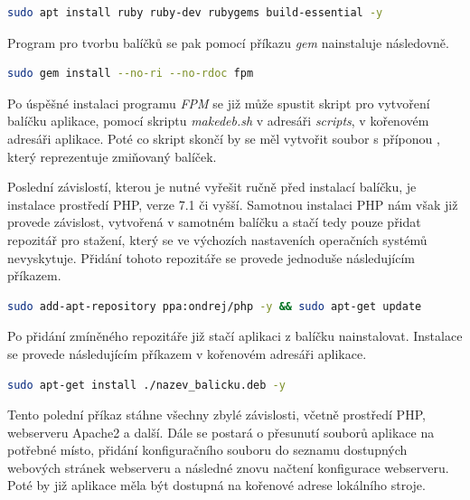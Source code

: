 \documentclass[thesis=M,czech]{FITthesis}[2012/06/26]
\begin{document}
\begin{lstlisting}[language=bash,identifierstyle=\color{black}]
sudo apt install ruby ruby-dev rubygems build-essential -y
\end{lstlisting}

Program pro tvorbu balíčků se pak pomocí příkazu \textit{gem} nainstaluje následovně.\\

\begin{lstlisting}[language=bash,identifierstyle=\color{black}]
sudo gem install --no-ri --no-rdoc fpm
\end{lstlisting}

Po úspěšné instalaci programu \textit{FPM} se již může spustit skript pro vytvoření balíčku aplikace, pomocí skriptu \textit{makedeb.sh} v adresáři \textit{scripts}, v kořenovém adresáři aplikace. Poté co skript skončí by se měl vytvořit soubor s příponou , který reprezentuje zmiňovaný balíček.

Poslední závislostí, kterou je nutné vyřešit ručně před instalací balíčku, je instalace prostředí PHP, verze 7.1 či vyšší. Samotnou instalaci PHP nám však již provede závislost, vytvořená v samotném balíčku a stačí tedy pouze přidat repozitář pro stažení, který se ve výchozích nastaveních operačních systémů nevyskytuje. Přidání tohoto repozitáře se provede jednoduše následujícím příkazem.\\

\begin{lstlisting}[language=bash,identifierstyle=\color{black}]
sudo add-apt-repository ppa:ondrej/php -y && sudo apt-get update
\end{lstlisting}

Po přidání zmíněného repozitáře již stačí aplikaci z balíčku nainstalovat. Instalace se provede následujícím příkazem v kořenovém adresáři aplikace.\\

\begin{lstlisting}[language=bash,identifierstyle=\color{black}]
sudo apt-get install ./nazev_balicku.deb -y
\end{lstlisting}

Tento polední příkaz stáhne všechny zbylé závislosti, včetně prostředí PHP, webserveru Apache2 a další. Dále se postará o přesunutí souborů aplikace na potřebné místo, přidání konfiguračního souboru do seznamu dostupných webových stránek webserveru a následné znovu načtení konfigurace webserveru. Poté by již aplikace měla být dostupná na kořenové adrese lokálního stroje.
\end{document}
